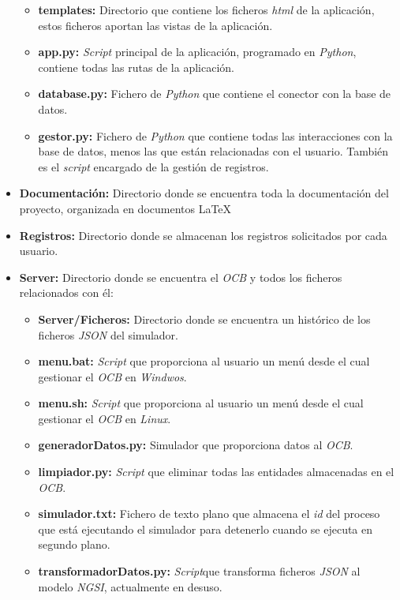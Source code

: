 \begin{itemize}
\begin{itemize}
\begin{itemize}
        \end{itemize}
        \item \textbf{templates:} Directorio que contiene los ficheros \textit{html} de la aplicación, estos ficheros aportan las vistas de la aplicación.
        \item \textbf{app.py:} \textit{Script} principal de la aplicación, programado en \textit{Python}, contiene todas las rutas de la aplicación.
        \item \textbf{database.py:} Fichero de \textit{Python} que contiene el conector con la base de datos.
        \item \textbf{gestor.py:} Fichero de \textit{Python} que contiene todas las interacciones con la base de datos, menos las que están relacionadas con el usuario. También es el \textit{script} encargado de la gestión de registros.
    \end{itemize}
    \item \textbf{Documentación:} Directorio donde se encuentra toda la documentación del proyecto, organizada en documentos \LaTeX{}
    \item \textbf{Registros:} Directorio donde se almacenan los registros solicitados por cada usuario.
    \item \textbf{Server:} Directorio donde se encuentra el \textit{OCB} y todos los ficheros relacionados con él:
    \begin{itemize}
        \item \textbf{Server/Ficheros:} Directorio donde se encuentra un histórico de los ficheros \textit{JSON} del simulador.
        \item \textbf{menu.bat:} \textit{Script} que proporciona al usuario un menú desde el cual gestionar el \textit{OCB} en \textit{Windwos}.
        \item \textbf{menu.sh:} \textit{Script} que proporciona al usuario un menú desde el cual gestionar el \textit{OCB} en \textit{Linux}.
        \item \textbf{generadorDatos.py:} Simulador que proporciona datos al \textit{OCB}.
        \item \textbf{limpiador.py:} \textit{Script} que eliminar todas las entidades almacenadas en el \textit{OCB}.
        \item \textbf{simulador.txt:} Fichero de texto plano que almacena el \textit{id} del proceso que está ejecutando el simulador para detenerlo cuando se ejecuta en segundo plano.
        \item \textbf{transformadorDatos.py:} \textit{Script}que transforma ficheros \textit{JSON} al modelo \textit{NGSI}, actualmente en desuso.

\end{itemize}
\end{itemize}
